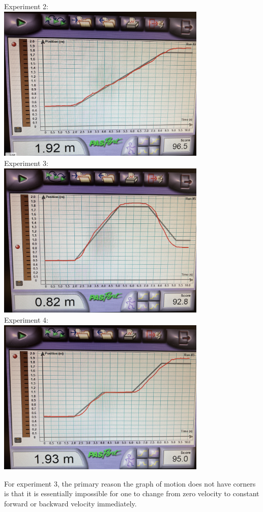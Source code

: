 \documentclass[8pt]{extarticle}
\begin{document}
{\begin{center}
	Experiment 2:\\
	\includegraphics[width=10cm]{Lab2Image1_3_2}\\
	\pagebreak
	Experiment 3:\\
	\includegraphics[width=10cm]{Lab2Image1_3_3}\\
	Experiment 4:\\
	\includegraphics[width=10cm]{Lab2Image1_3_4}
\end{center}
For experiment 3, the primary reason the graph of motion does not have corners is that it is essentially impossible for one to change from zero velocity to constant forward or backward velocity immediately.
}
\end{document}
